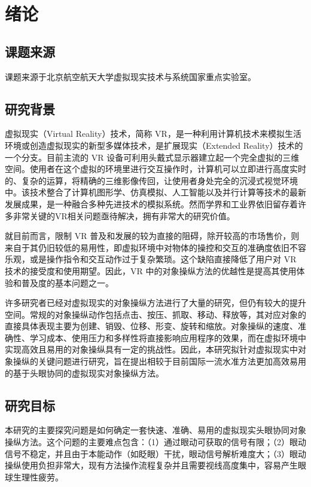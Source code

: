 \chapter{绪论}

\section{课题来源}

课题来源于北京航空航天大学虚拟现实技术与系统国家重点实验室。

\section{研究背景}

虚拟现实（Virtual Reality）技术，简称 VR，是一种利用计算机技术来模拟生活环境或创造虚拟现实的新型多媒体技术，是扩展现实（Extended Reality）技术的一个分支。目前主流的 VR 设备可利用头戴式显示器建立起一个完全虚拟的三维空间。使用者在这个虚拟的环境里进行交互操作时，计算机可以立即进行高度实时的、复杂的运算，将精确的三维影像传回，让使用者身处完全的沉浸式视觉环境中。该技术整合了计算机图形学、仿真模拟、人工智能以及并行计算等技术的最新发展成果，是一种融合多种先进技术的模拟系统。然而学界和工业界依旧留存着许多非常关键的VR相关问题亟待解决，拥有非常大的研究价值。

就目前而言，限制 VR 普及和发展的较为直接的阻碍，除开较高的市场售价，则来自于其仍旧较低的易用性，即虚拟环境中对物体的操控和交互的准确度依旧不容乐观，或是操作指令和交互动作过于复杂繁琐。这个缺陷直接降低了用户对 VR 技术的接受度和使用期望。因此，VR 中的对象操纵方法的优越性是提高其使用体验和普及度的基本问题之一。

许多研究者已经对虚拟现实的对象操纵方法进行了大量的研究，但仍有较大的提升空间。常规的对象操纵动作包括点击、按压、抓取、移动、释放等，其对应对象的直接具体表现主要为创建、销毁、位移、形变、旋转和缩放。对象操纵的速度、准确性、学习成本、使用压力和多样性将直接影响应用程序的效果，而在虚拟环境中实现高效且易用的对象操纵具有一定的挑战性。因此，本研究拟针对虚拟现实中对象操纵的关键问题进行研究，旨在提出相较于目前国际一流水准方法更加高效易用的基于头眼协同的虚拟现实对象操纵方法。

\section{研究目标}

本研究的主要探究问题是如何确定一套快速、准确、易用的虚拟现实头眼协同对象操纵方法。这个问题的主要难点包含：（1）通过眼动可获取的信号有限；（2）眼动信号不稳定，并且由于本能动作（如眨眼）干扰，眼动信号解析难度大；（3）眼动操纵使用负担非常大，现有方法操作流程复杂并且需要视线高度集中，容易产生眼球生理性疲劳。

